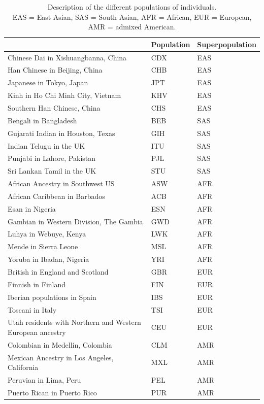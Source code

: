 \documentclass[a4paper,11pt]{article}
\theoremstyle{plain}
\newcommand{\1}{\mathbf{1}}
\begin{document}
\begin{table}[H]
\centering
\renewcommand{\arraystretch}{1.2}
\caption{Description of the different populations of individuals. \\
\small EAS = East Asian, SAS = South Asian, AFR = African, EUR = European, AMR = admixed American.}
\label{table:indiv}

\begin{tabular}{>{\raggedright\arraybackslash}p{8cm} l l}
\toprule
\multicolumn{1}{c}{\textbf{Description}} &
\multicolumn{1}{c}{\textbf{Population}} &
\multicolumn{1}{c}{\textbf{Superpopulation}} \\
\midrule

Chinese Dai in Xishuangbanna, China & CDX & EAS \\
Han Chinese in Beijing, China & CHB & EAS \\
Japanese in Tokyo, Japan & JPT & EAS \\
Kinh in Ho Chi Minh City, Vietnam & KHV & EAS \\
Southern Han Chinese, China & CHS & EAS \\

Bengali in Bangladesh & BEB & SAS \\
Gujarati Indian in Houston, Texas & GIH & SAS \\
Indian Telugu in the UK & ITU & SAS \\
Punjabi in Lahore, Pakistan & PJL & SAS \\
Sri Lankan Tamil in the UK & STU & SAS \\

African Ancestry in Southwest US & ASW & AFR \\
African Caribbean in Barbados & ACB & AFR \\
Esan in Nigeria & ESN & AFR \\
Gambian in Western Division, The Gambia & GWD & AFR \\
Luhya in Webuye, Kenya & LWK & AFR \\
Mende in Sierra Leone & MSL & AFR \\
Yoruba in Ibadan, Nigeria & YRI & AFR \\

British in England and Scotland & GBR & EUR \\
Finnish in Finland & FIN & EUR \\
Iberian populations in Spain & IBS & EUR \\
Toscani in Italy & TSI & EUR \\
Utah residents with Northern and Western European ancestry & CEU & EUR \\

Colombian in Medellín, Colombia & CLM & AMR \\
Mexican Ancestry in Los Angeles, California & MXL & AMR \\
Peruvian in Lima, Peru & PEL & AMR \\
Puerto Rican in Puerto Rico & PUR & AMR \\

\bottomrule
\end{tabular}
\end{table}


\newpage





\end{document}
